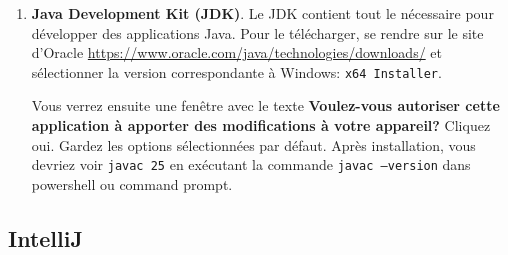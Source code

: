 \begin{enumerate}
    \newpage

    \item \textbf{Java Development Kit (JDK)}. Le JDK contient tout 
    le nécessaire pour développer des applications Java. 
    Pour le télécharger, se rendre sur le site 
    d'Oracle \url{https://www.oracle.com/java/technologies/downloads/} 
    et sélectionner la version correspondante 
    à Windows: \texttt{x64 Installer}. \newline 
    
    Vous verrez ensuite une fenêtre avec le texte \textbf{Voulez-vous autoriser cette application à apporter des modifications à votre appareil?} Cliquez oui. Gardez les options sélectionnées par défaut. Après installation, vous devriez voir \texttt{javac 25} en exécutant la commande \texttt{javac --version} dans powershell ou command prompt. 
\end{enumerate}

\subsection*{IntelliJ}

